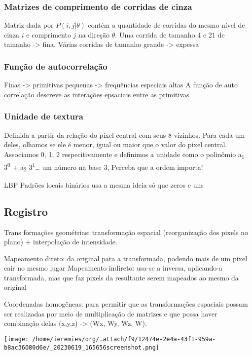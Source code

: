 \documentclass[twocolumn, 9pt]{article}
\begin{document}
\subsubsection*{Matrizes de comprimento de corridas de cinza}
\label{sec:orgefbd0f9}
Matriz dada por \(P(i,j|\theta)\) contém a quantidade de corridas do mesmo nível de cinza \(i\) e comprimento \(j\) na direção \(\theta\).
Uma corrida de tamanho 4 e 21 de tamanho -> fina.
Várias corridas de tamanho grande -> expessa

\subsubsection*{Função de autocorrelação}
\label{sec:org6cd1d50}
Finas -> primitivas pequenas -> frequências especiais altas
A função de auto correlação descreve as interações epsaciais entre as primitivas
\subsubsection*{Unidade de textura}
\label{sec:orgfdacddc}
Definida a partir da relação do pixel central com seus 8 vizinhos. Para cada um deles, olhamos se ele é menor, igual ou maior que o valor do pixel central. Associamos 0, 1, 2 respecitivamente e definimos a unidade como o polinômio a\textsubscript{1} 3\textsuperscript{0} +  a\textsubscript{2} 3\textsuperscript{1}\ldots{} um número na base 3, Perceba que a ordem importa!

LBP Padrões locais binários usa a mesma ideia só que zeros e uns
\subsection*{Registro}
\label{sec:org0e52fa1}
Trans formações geométrias: transformação espacial (reorganização dos pixels no plano) + interpolação de intensidade.

Mapeamento direto: da original para a transformada, podendo mais de um pixel cair no mesmo lugar
Mapeamento indireto: usa-se a inversa, aplicando-a transformada, mas que faz pixels da resultante serem mapeados ao mesmo da original

Coordenadas homogêneas: para permitir que as transformações espaciais possam ser realizadas por meio de multiplicação de matrizes e que possa haver combinação delas (x,y,z) -> (Wx, Wy, Wz, W).

\begin{center}
\texttt{[image: /home/ieremies/org/.attach/f9/12474e-2e4a-43f1-959a-b8ac36080d6e/\_20230619\_165656screenshot.png]}
\end{center}
\end{document}
